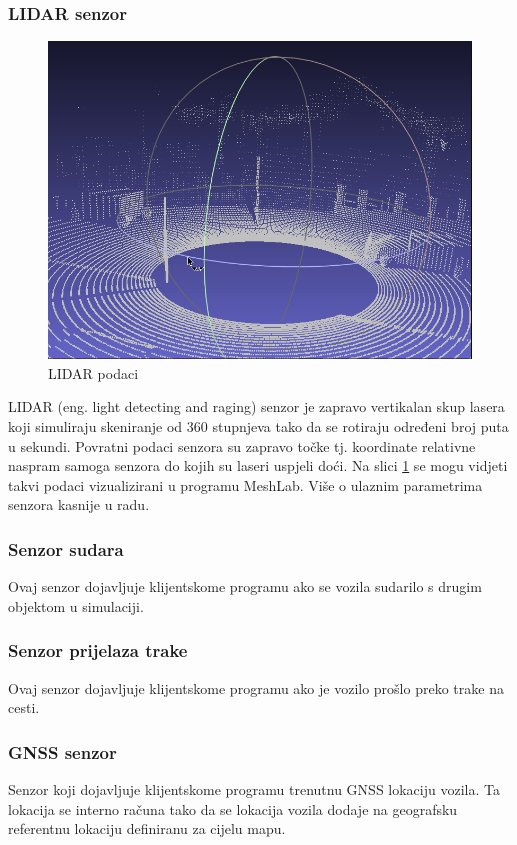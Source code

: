 \subsubsection{LIDAR senzor}
\begin{figure}[ht!]
  \centering
  \includegraphics[scale=0.5]{images/LIDAR_examaple.png}
  \caption{LIDAR podaci}
  \label{fig:lidar_exmaple}
\end{figure}
LIDAR (eng. light detecting and raging) senzor je zapravo vertikalan skup lasera koji simuliraju skeniranje od 360 stupnjeva tako da se rotiraju određeni broj puta u sekundi. Povratni podaci senzora su zapravo točke tj. koordinate relativne naspram samoga senzora do kojih su laseri uspjeli doći. Na slici \ref{fig:lidar_exmaple} se mogu vidjeti takvi podaci vizualizirani u programu MeshLab. Više o ulaznim parametrima senzora kasnije u radu.

\subsubsection{Senzor sudara}
Ovaj senzor dojavljuje klijentskome programu ako se vozila sudarilo s drugim objektom u simulaciji.

\subsubsection{Senzor prijelaza trake}
Ovaj senzor dojavljuje klijentskome programu ako je vozilo prošlo preko trake na cesti.

\subsubsection{GNSS senzor}
Senzor koji dojavljuje klijentskome programu trenutnu GNSS lokaciju vozila. Ta lokacija se interno računa tako da se lokacija vozila dodaje na geografsku referentnu lokaciju definiranu za cijelu mapu.

